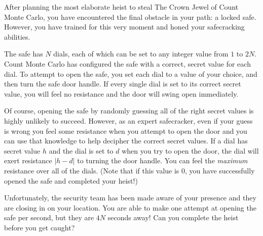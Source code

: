 


After planning the most elaborate heist to steal The Crown Jewel of Count Monte Carlo, you have encountered the final obstacle in your path: a locked safe. However, you have trained for this very moment and honed your safecracking abilities.

The safe has $N$ dials, each of which can be set to any integer value from $1$ to $2N$. Count Monte Carlo has configured the safe with a correct, secret value for each dial. To attempt to open the safe, you set each dial to a value of your choice, and then turn the safe door handle. If every single dial is set to its correct secret value, you will feel no resistance and the door will swing open immediately.

Of course, opening the safe by randomly guessing all of the right secret values is highly unlikely to succeed. However, as an expert safecracker, even if your guess is wrong you feel some resistance when you attempt to open the door and you can use that knowledge to help decipher the correct secret values. If a dial has secret value $h$ and the dial is set to $d$ when you try to open the door, the dial will exert resistance $|h-d|$ to turning the door handle. You can feel the \emph{maximum} resistance over all of the dials. (Note that if this value is $0$, you have successfully opened the safe and completed your heist!)

Unfortunately, the security team has been made aware of your presence and they are closing in on your location. You are able to make one attempt at opening the safe per second, but they are $4N$ seconds away! Can you complete the heist before you get caught?


